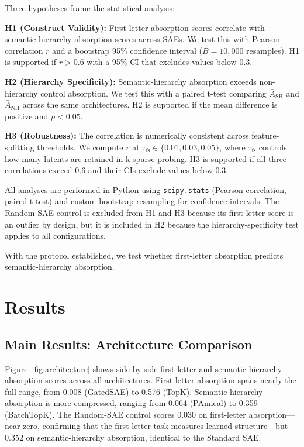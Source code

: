 \documentclass{article}
\begin{document}
Three hypotheses frame the statistical analysis:

\textbf{H1 (Construct Validity):} First-letter absorption scores correlate with semantic-hierarchy absorption scores across SAEs. We test this with Pearson correlation $r$ and a bootstrap 95\% confidence interval ($B = 10{,}000$ resamples). H1 is supported if $r > 0.6$ with a 95\% CI that excludes values below 0.3.

\textbf{H2 (Hierarchy Specificity):} Semantic-hierarchy absorption exceeds non-hierarchy control absorption. We test this with a paired t-test comparing $\bar{A}_{\text{SH}}$ and $\bar{A}_{\text{NH}}$ across the same architectures. H2 is supported if the mean difference is positive and $p < 0.05$.

\textbf{H3 (Robustness):} The correlation is numerically consistent across feature-splitting thresholds. We compute $r$ at $\tau_{\text{fs}} \in \{0.01, 0.03, 0.05\}$, where $\tau_{\text{fs}}$ controls how many latents are retained in k-sparse probing. H3 is supported if all three correlations exceed 0.6 and their CIs exclude values below 0.3.

All analyses are performed in Python using \texttt{scipy.stats} (Pearson correlation, paired t-test) and custom bootstrap resampling for confidence intervals. The Random-SAE control is excluded from H1 and H3 because its first-letter score is an outlier by design, but it is included in H2 because the hierarchy-specificity test applies to all configurations.

With the protocol established, we test whether first-letter absorption predicts semantic-hierarchy absorption.

\section{Results}

\subsection{Main Results: Architecture Comparison}
\label{sec:main_results}

Figure~\ref{fig:architecture} shows side-by-side first-letter and semantic-hierarchy absorption scores across all architectures. First-letter absorption spans nearly the full range, from 0.008 (GatedSAE) to 0.576 (TopK). Semantic-hierarchy absorption is more compressed, ranging from 0.064 (PAnneal) to 0.359 (BatchTopK). The Random-SAE control scores 0.030 on first-letter absorption---near zero, confirming that the first-letter task measures learned structure---but 0.352 on semantic-hierarchy absorption, identical to the Standard SAE.
\end{document}
